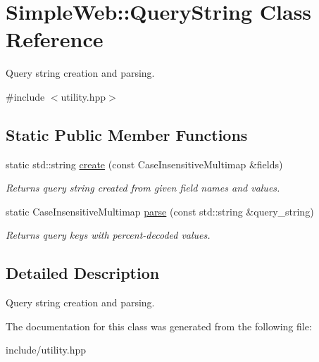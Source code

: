\hypertarget{classSimpleWeb_1_1QueryString}{}\section{Simple\+Web\+:\+:Query\+String Class Reference}
\label{classSimpleWeb_1_1QueryString}


Query string creation and parsing.  




{\ttfamily \#include $<$utility.\+hpp$>$}

\subsection*{Static Public Member Functions}
\begin{DoxyCompactItemize}
\item 
static std\+::string \hyperlink{classSimpleWeb_1_1QueryString_a89c87f4bc8b3e788f4390fcb57087f39}{create} (const Case\+Insensitive\+Multimap \&fields)\hypertarget{classSimpleWeb_1_1QueryString_a89c87f4bc8b3e788f4390fcb57087f39}{}\label{classSimpleWeb_1_1QueryString_a89c87f4bc8b3e788f4390fcb57087f39}

\begin{DoxyCompactList}\small\item\em Returns query string created from given field names and values. \end{DoxyCompactList}\item 
static Case\+Insensitive\+Multimap \hyperlink{classSimpleWeb_1_1QueryString_a3645953a3e080f34dfb78434ecd61c9c}{parse} (const std\+::string \&query\+\_\+string)\hypertarget{classSimpleWeb_1_1QueryString_a3645953a3e080f34dfb78434ecd61c9c}{}\label{classSimpleWeb_1_1QueryString_a3645953a3e080f34dfb78434ecd61c9c}

\begin{DoxyCompactList}\small\item\em Returns query keys with percent-\/decoded values. \end{DoxyCompactList}\end{DoxyCompactItemize}


\subsection{Detailed Description}
Query string creation and parsing. 

The documentation for this class was generated from the following file\+:\begin{DoxyCompactItemize}
\item 
include/utility.\+hpp\end{DoxyCompactItemize}
